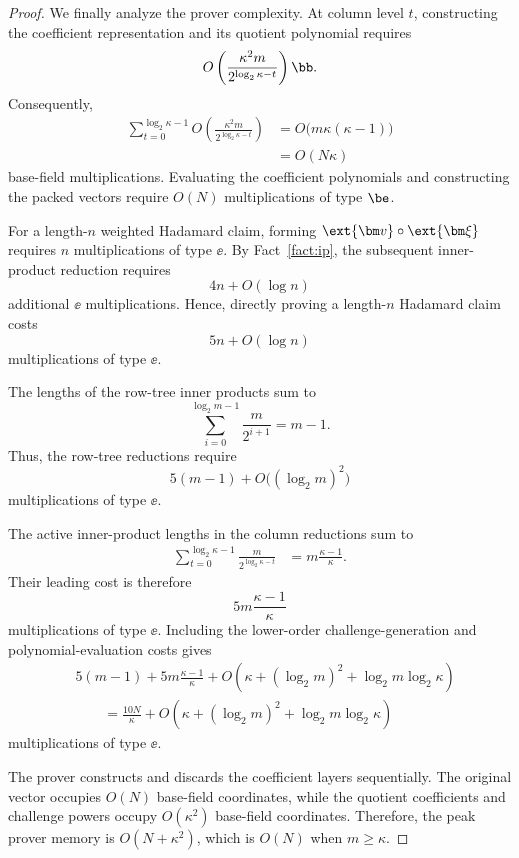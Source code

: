 \begin{proof}
We finally analyze the prover complexity. At column level \(t\),
constructing the coefficient representation and its quotient
polynomial requires
\[
    O\left(
        \frac{
            \kappa^2m
        }{
            2^{\log_2\kappa-t}
        }
    \right)\bb.
\]
Consequently,
\[
\begin{aligned}
    \sum_{t=0}^{\log_2\kappa-1}
    O\left(
        \frac{
            \kappa^2m
        }{
            2^{\log_2\kappa-t}
        }
    \right)
    &=
    O\bigl(m\kappa(\kappa-1)\bigr)\\
    &=
    O(N\kappa)
\end{aligned}
\]
base-field multiplications. Evaluating the coefficient
polynomials and constructing the packed vectors require
\(O(N)\) multiplications of type \(\be\).

For a length-\(n\) weighted Hadamard claim, forming
\(
    \ext{\bm v}\circ\ext{\bm\xi}
\)
requires \(n\) multiplications of type \(\ee\). By
Fact~\ref{fact:ip}, the subsequent inner-product reduction
requires
\[
    4n+O(\log n)
\]
additional \(\ee\) multiplications. Hence, directly proving a
length-\(n\) Hadamard claim costs
\[
    5n+O(\log n)
\]
multiplications of type \(\ee\).

The lengths of the row-tree inner products sum to
\[
    \sum_{i=0}^{\log_2m-1}
    \frac{m}{2^{i+1}}
    =
    m-1.
\]
Thus, the row-tree reductions require
\[
    5(m-1)
    +
    O\bigl((\log_2m)^2\bigr)
\]
multiplications of type \(\ee\).

The active inner-product lengths in the column reductions sum to
\[
\begin{aligned}
    \sum_{t=0}^{\log_2\kappa-1}
    \frac{m}{2^{\log_2\kappa-t}}
    &=
    m\frac{\kappa-1}{\kappa}.
\end{aligned}
\]
Their leading cost is therefore
\[
    5m\frac{\kappa-1}{\kappa}
\]
multiplications of type \(\ee\). Including the lower-order
challenge-generation and polynomial-evaluation costs gives
\[
\begin{aligned}
    &5(m-1)
    +
    5m\frac{\kappa-1}{\kappa}
    +
    O\left(
        \kappa
        +
        (\log_2m)^2
        +
        \log_2m\log_2\kappa
    \right)\\
    &\qquad=
    \frac{10N}{\kappa}
    +
    O\left(
        \kappa
        +
        (\log_2m)^2
        +
        \log_2m\log_2\kappa
    \right)
\end{aligned}
\]
multiplications of type \(\ee\).

The prover constructs and discards the coefficient layers
sequentially. The original vector occupies \(O(N)\) base-field
coordinates, while the quotient coefficients and challenge
powers occupy \(O(\kappa^2)\) base-field coordinates. Therefore,
the peak prover memory is \(O(N+\kappa^2)\), which is \(O(N)\)
when \(m\geq\kappa\).
\end{proof}

